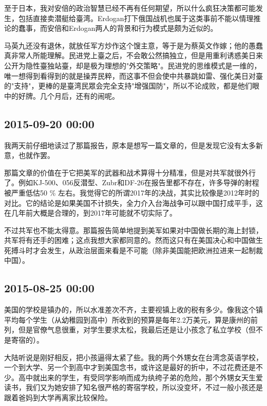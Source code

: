 \documentclass[twocolumn]{ctexart}
\begin{document}
至于日本，我对安倍的政治智慧已经不再有任何期望，所以什么疯狂决策都可能发生，包括直接卖潜艇给臺湾。Erdogan打下俄国战机也属于这类事前不能以情理推论的蠢事，而安倍和Erdogan两人的背景和行为模式是颇为近似的。

马英九还没有退休，就放任军方炒作这个馊主意，等于是为蔡英文作嫁；他的愚蠢真非常人所能理解。民进党上臺之后，不会敢公然搞独立，但是用重利诱惑美日来公开为隐性臺独站臺，却是极为理想的"外交策略"。民进党的思维模式是一维的，唯一想得到看得到的就是操弄民粹，而这事不但会使中共暴跳如雷、强化美日对臺的"支持"，更棒的是臺湾民眾会完全支持"增强国防"，所以不论成败，都是他们眼中的好牌。几个月后，还有的闹呢。\subsection*{2015-09-20 00:00}
我两天前仔细地读过了那篇报告，原本是想写一篇文章的，但是发现它没有太多新意，也就作罢。

那篇文章的价值在于它把美军的武器和战术算得十分精准，但是对共军就很外行了。例如KJ-500、056反潜型、Zubr和DF-26在报告里都不存在，许多导弹的射程被严重低估50 \% 左右。我觉得它的所谓2017年的决战，其实比较像是2012年时的对比。它的结论是如果美国不计损失，全力介入台海战争可以跟中国打成平手，这在几年前大概是合理的，到2017年可能就不切实际了。

不过共军也不能太得意。那篇报告简单地提到美军如果对中国做长期的海上封锁，共军将有还手的困难；这点我想大家都同意的。然而这只有在美国决心和中国做生死搏斗时才会发生，从政治层面来看是不可能（除非美国能把欧洲拉进来一起制裁中国）。\subsection*{2015-08-25 00:00}
美国的学校是镇办的，所以水准差次不齐，主要视镇上收的税有多少。像我这个镇平均每个学生（从幼稚园到高中）所收到的预算是每年2.2万美元，算是康州的前列，但是官僚气息很重，对学生要求太松，我最后还是让小孩念了私立学校（但不是寄宿的）。

大陆听说是刚好相反，把小孩逼得太紧了些。我的两个外甥女在台湾念英语学校，一个到大学、另一个到高中才到美国念书，或许这是最好的折中，不过花费还是不少。高中就出来的学生，有受同学影响而成为纨绔子弟的危险，那个外甥女天生爱读书，我们又为她安排了知名很严格的寄宿学校，所以没变坏，不过一般小孩还是跟着爸妈到大学再离家比较保险。
\end{document}
